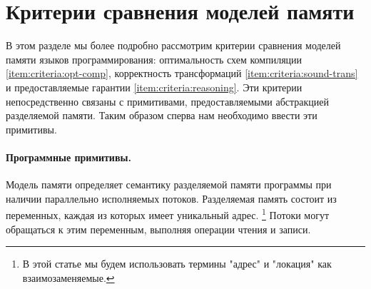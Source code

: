 \section{Критерии сравнения моделей памяти}
\label{sec:background}

В этом разделе мы более подробно рассмотрим 
критерии сравнения моделей памяти языков программирования:
 оптимальность схем компиляции \ref{item:criteria:opt-comp},
корректность трансформаций \ref{item:criteria:sound-trans}
и предоставляемые гарантии \ref{item:criteria:reasoning}.
Эти критерии непосредственно связаны с примитивами, 
предоставляемыми абстракцией разделяемой памяти. 
Таким образом сперва нам необходимо ввести эти примитивы. 

\paragraph{Программные примитивы.}
\label{sec:background:primitives}

Модель памяти определяет семантику разделяемой памяти программы
при наличии  параллельно исполняемых потоков. 
Разделяемая память состоит из переменных, 
каждая из которых имеет уникальный адрес.%
\footnote{В этой статье мы будем использовать 
термины "адрес" и "локация" как взаимозаменяемые.}
Потоки могут обращаться к этим переменным, 
выполняя операции чтения и записи. 

